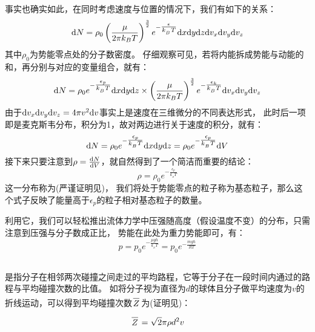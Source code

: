             事实也确实如此，在同时考虑速度与位置的情况下，我们有如下的关系：
            \begin{equation}
                \mathrm{d}{N}=\rho_{0}\left(\frac \mu{2\pi k_{B}T}\right)^{\frac{3}{2}}e^{-\tfrac{\epsilon}{k_{_B}T}}
                \mathrm{d}{x}\mathrm{d}{y}\mathrm{d}{z}\mathrm{d}{v_{x}}\mathrm{d}{v_{y}}\mathrm{d}{v_{z}}
                \nonumber
            \end{equation}
            其中$\rho_{0}$为势能零点处的分子数密度。
            仔细观察可见，若将内能拆成势能与动能的和，再分别与对应的变量组合，就有：
            \begin{equation}
                \mathrm{d}{N} =\rho_{0}e^{-\tfrac{\epsilon_{p}}{k_{_B}T}}\mathrm{d}{x}\mathrm{d}{y}\mathrm{d}{z}\times\left(\frac \mu{2\pi k_{B}T}\right)^{\frac{3}{2}}e^{-\tfrac{\epsilon_{k}}{k_{_B}T}}
                \mathrm{d}{v_{x}}\mathrm{d}{v_{y}}\mathrm{d}{v_{z}}
                \nonumber
            \end{equation}
            由于$\mathrm{d}{v_{x}}\mathrm{d}{v_{y}}\mathrm{d}{v_{z}}=4\pi v^{2}\mathrm{d}{v}$事实上是速度在三维微分的不同表达形式，
            此时后一项即是麦克斯韦分布，积分为1，故对两边进行关于速度的积分，就有：
            \begin{equation}
                \mathrm{d}{N} =\rho_{0}e^{-\tfrac{\epsilon_{p}}{k_{_B}T}}\mathrm{d}{x}\mathrm{d}{y}\mathrm{d}{z} =\rho_{0}e^{-\tfrac{\epsilon_{p}}{k_{_B}T}}\mathrm{d}{V}
                \nonumber
            \end{equation}
            接下来只要注意到$\rho = \frac{\mathrm{d}{N}}{\mathrm{d}{V}}$，就自然得到了一个简洁而重要的结论：
            \begin{equation}
                \rho = \rho_{0}e^{-\tfrac{\epsilon_{p}}{k_{_B}T}}
                \nonumber
            \end{equation}
            这一分布称为(严谨证明见)，
            我们将处于势能零点的粒子称为基态粒子，那么这个式子反映了能量高于$\epsilon_{p}$的粒子相对基态粒子的数量。
            
            利用它，我们可以轻松推出流体力学中压强随高度（假设温度不变）的分布，只需注意到压强与分子数成正比，
            势能在此处为重力势能即可，有：
            \begin{equation}
                p = p_{0}e^{-\tfrac{\mu gh}{k_{_B}T}} = p_{0}e^{-\tfrac{mgh}{RT}}
                \nonumber    
            \end{equation}
        \subsection[平均自由程]{}
            是指分子在相邻两次碰撞之间走过的平均路程，它等于分子在一段时间内通过的路程与平均碰撞次数的比值。
            如将分子视为直径为$d$的球体且分子做平均速度为$v$的折线运动，可以得到平均碰撞次数$\upperline{Z}$为(证明见)：
            \begin{equation}
                \upperline{Z} = \sqrt{2}\pi \rho d^{2} v
                \nonumber
            \end{equation}


